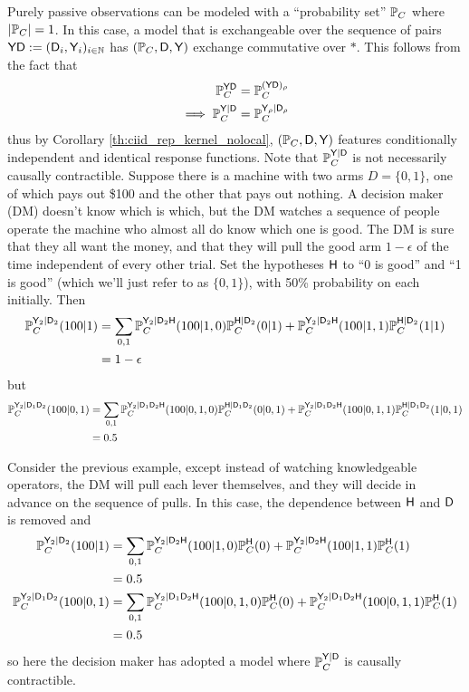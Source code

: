 Purely passive observations can be modeled with a ``probability set'' $\mathbb{P}_C$ where $|\mathbb{P}_C|=1$. In this case, a model that is exchangeable over the sequence of pairs $\mathsf{YD}:=(\mathsf{D}_i,\mathsf{Y}_i)_{i\in \mathbb{N}}$ has $(\mathbb{P}_C, \mathsf{D},\mathsf{Y})$ exchange commutative over $*$. This follows from the fact that
\begin{align}
    \mathbb{P}_C^{\mathsf{YD}} &= \mathbb{P}_C^{(\mathsf{Y}\mathsf{D})_\rho}\\
    \implies \mathbb{P}_C^{\mathsf{Y}|\mathsf{D}} &= \mathbb{P}_C^{\mathsf{Y}_\rho|\mathsf{D}_\rho}
\end{align}
thus by Corollary \ref{th:ciid_rep_kernel_nolocal}, $(\mathbb{P}_C, \mathsf{D},\mathsf{Y})$ features conditionally independent and identical response functions. Note that $\mathbb{P}_C^{\mathsf{Y}|\mathsf{D}}$ is not necessarily causally contractible. Suppose there is a machine with two arms $D=\{0,1\}$, one of which pays out \$100 and the other that pays out nothing. A decision maker (DM) doesn't know which is which, but the DM watches a sequence of people operate the machine who almost all do know which one is good. The DM is sure that they all want the money, and that they will pull the good arm $1-\epsilon$ of the time independent of every other trial. Set the hypotheses $\mathsf{H}$ to ``0 is good'' and ``1 is good'' (which we'll just refer to as $\{0,1\}$), with 50\% probability on each initially. Then
\begin{align}
    \mathbb{P}_C^{\mathsf{Y}_2|\mathsf{D}_2}(100|1) &= \sum_{0,1} \mathbb{P}_C^{\mathsf{Y}_2|\mathsf{D}_2\mathsf{H}}(100|1,0)\mathbb{P}_C^{\mathsf{H}|\mathsf{D}_2}(0|1) + \mathbb{P}_C^{\mathsf{Y}_2|\mathsf{D}_2\mathsf{H}}(100|1,1)\mathbb{P}_C^{\mathsf{H}|\mathsf{D}_2}(1|1)\\
    &= 1-\epsilon
\end{align}
but
\begin{align}
    \mathbb{P}_C^{\mathsf{Y}_2|\mathsf{D}_1\mathsf{D}_2}(100|0,1) &= \sum_{0,1} \mathbb{P}_C^{\mathsf{Y}_2|\mathsf{D}_1\mathsf{D}_2\mathsf{H}}(100|0,1,0)\mathbb{P}_C^{\mathsf{H}|\mathsf{D}_1\mathsf{D}_2}(0|0,1) + \mathbb{P}_C^{\mathsf{Y}_2|\mathsf{D}_1\mathsf{D}_2\mathsf{H}}(100|0,1,1)\mathbb{P}_C^{\mathsf{H}|\mathsf{D}_1\mathsf{D}_2}(1|0,1)\\
    &= 0.5
\end{align}

Consider the previous example, except instead of watching knowledgeable operators, the DM will pull each lever themselves, and they will decide in advance on the sequence of pulls. In this case, the dependence between $\mathsf{H}$ and $\mathsf{D}$ is removed and
\begin{align}
        \mathbb{P}_C^{\mathsf{Y}_2|\mathsf{D}_2}(100|1) &= \sum_{0,1} \mathbb{P}_C^{\mathsf{Y}_2|\mathsf{D}_2\mathsf{H}}(100|1,0)\mathbb{P}_C^{\mathsf{H}}(0) + \mathbb{P}_C^{\mathsf{Y}_2|\mathsf{D}_2\mathsf{H}}(100|1,1)\mathbb{P}_C^{\mathsf{H}}(1)\\
        &= 0.5\\
        \mathbb{P}_C^{\mathsf{Y}_2|\mathsf{D}_1\mathsf{D}_2}(100|0,1) &= \sum_{0,1} \mathbb{P}_C^{\mathsf{Y}_2|\mathsf{D}_1\mathsf{D}_2\mathsf{H}}(100|0,1,0)\mathbb{P}_C^{\mathsf{H}}(0) + \mathbb{P}_C^{\mathsf{Y}_2|\mathsf{D}_1\mathsf{D}_2\mathsf{H}}(100|0,1,1)\mathbb{P}_C^{\mathsf{H}}(1)\\
        &= 0.5
\end{align}
so here the decision maker has adopted a model where $\mathbb{P}_C^{\mathsf{Y}|\mathsf{D}}$ is causally contractible.

